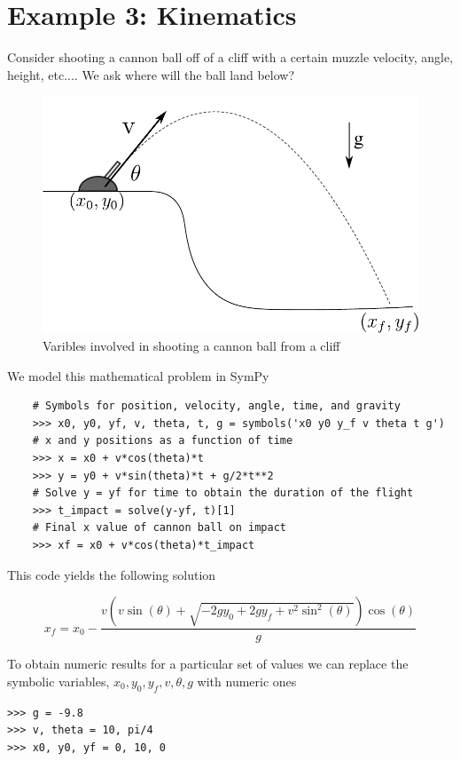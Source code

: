 \section{Example 3: Kinematics}

Consider shooting a cannon ball off of a cliff with a certain muzzle velocity, angle, height, etc.... We ask where will the ball land below?

\begin{figure}[ht]
\vspace{-0pt}
\centering
\includegraphics[width=.55\textwidth]{images/kinematics}
\vspace{-0pt}
\caption{Varibles involved in shooting a cannon ball from a cliff}
\label{fig:kinematics}
\vspace{00pt}
\end{figure}
We model this mathematical problem in SymPy

\begin{lstlisting}
    # Symbols for position, velocity, angle, time, and gravity
    >>> x0, y0, yf, v, theta, t, g = symbols('x0 y0 y_f v theta t g') 
    # x and y positions as a function of time
    >>> x = x0 + v*cos(theta)*t
    >>> y = y0 + v*sin(theta)*t + g/2*t**2
    # Solve y = yf for time to obtain the duration of the flight
    >>> t_impact = solve(y-yf, t)[1]
    # Final x value of cannon ball on impact
    >>> xf = x0 + v*cos(theta)*t_impact
\end{lstlisting}
This code yields the following solution

\begin{equation}
\label{eqn:kinematics_symbolic}
x_f = x_{0} - \frac{v \left(v \sin{\left (\theta \right )} + \sqrt{- 2 g y_{0} + 2 g y_f + v^{2} \sin^{2}{\left (\theta \right )}}\right) \cos{\left (\theta \right )}}{g}
\end{equation}

To obtain numeric results for a particular set of values we can replace the symbolic variables, $x_0, y_0, y_f, v, \theta, g$ with numeric ones

\begin{lstlisting}
>>> g = -9.8
>>> v, theta = 10, pi/4
>>> x0, y0, yf = 0, 10, 0
\end{lstlisting}

